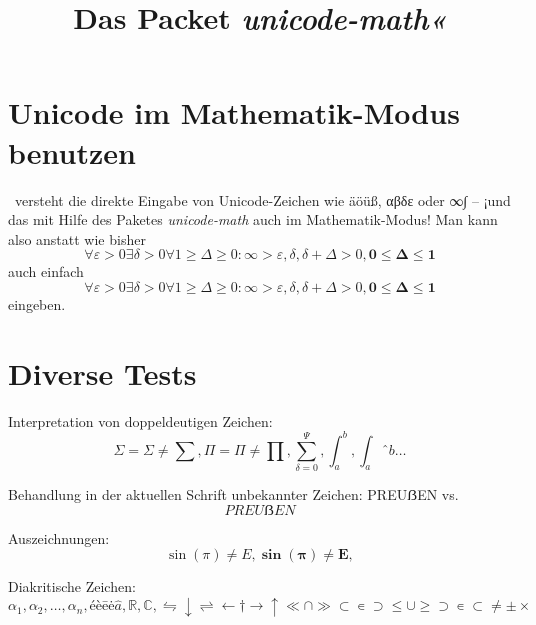 ﻿\documentclass{article}
\begin{document}
\title{Das Packet \emph{unicode-math«}}


\section{Unicode im Mathematik-Modus benutzen}
\XeLaTeX\ versteht die direkte Eingabe von Unicode-Zeichen wie äöüß, αβδε oder ∞∫ – ¡und das mit Hilfe des Paketes \emph{unicode-math} auch im Mathematik-Modus! Man kann also anstatt wie bisher
\[ \forall \varepsilon>0 \exists \delta>0 \forall 1 \geq\Delta\geq0: \infty>\varepsilon,\delta,\delta+\Delta>0, \mathbf{0\leq\Delta\leq1} \]
auch einfach
\[ ∀ ε>0 ∃ δ>0 ∀1≥Δ≥0: ∞>ε,δ,δ+Δ>0, \mathbf{0≤Δ≤1} \]
eingeben.

\section{Diverse Tests}
Interpretation von doppeldeutigen Zeichen:
\[ Σ=\Sigma ≠ \sum, Π=\Pi ≠ \prod, \sum_{δ=0}^Ψ, ∫_a^b, \int_aˆb… \]

Behandlung in der aktuellen Schrift unbekannter Zeichen: PREUẞEN vs.
\[ PREUẞEN \]

Auszeichnungen:
\[ \sin(π) ≠ E, \mathbf{\sin(π) ≠ E,}  \]

Diakritische Zeichen:
\[ α_1, α_2, …, α_n, é è ē ė \hat{a}, ℝ, ℂ, ⇋↓⇌←†→↑≪∩≫⊂∊⊃≤∪≥⊃∊⊂≠±× \]
\end{document}
